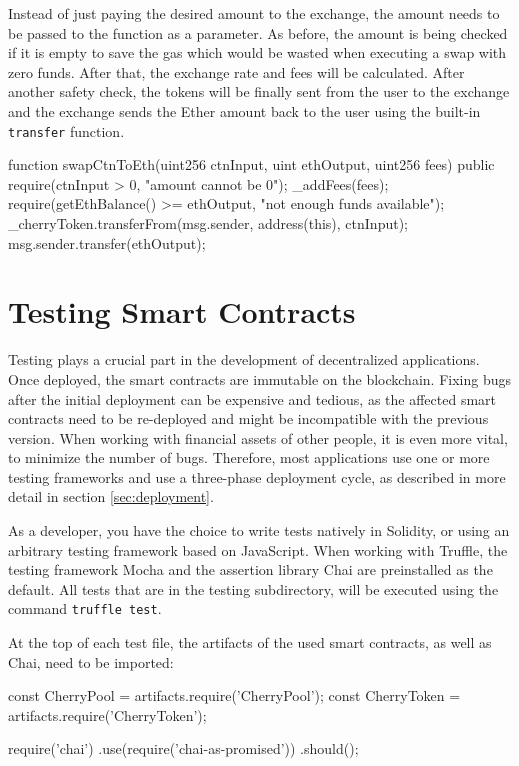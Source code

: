 Instead of just paying the desired amount to the exchange, the amount needs to be passed to the function as a parameter. As before, the amount is being checked
if it is empty to save the gas which would be wasted when executing a swap with zero funds. After that, the exchange rate and fees will be calculated. After
another safety check, the tokens will be finally sent from the user to the exchange and the exchange sends the Ether amount back to the user using the
built-in \texttt{transfer} function.

\begin{GenericCode}
  function swapCtnToEth(uint256 ctnInput, uint ethOutput, uint256 fees) public {
    require(ctnInput > 0, "amount cannot be 0");
    _addFees(fees);
    require(getEthBalance() >= ethOutput, "not enough funds available");
    _cherryToken.transferFrom(msg.sender, address(this), ctnInput);
    msg.sender.transfer(ethOutput);
  }
\end{GenericCode}

\section{Testing Smart Contracts}
Testing plays a crucial part in the development of decentralized applications. Once deployed, the smart contracts are immutable on the blockchain. Fixing bugs after the initial deployment can be expensive and tedious, as the affected smart contracts need to be re-deployed and might be incompatible with the previous version. When working with financial assets of other people, it is even more vital, to minimize the number of bugs. Therefore, most applications use one or more testing frameworks and use a three-phase deployment cycle, as described in more detail in section \ref{sec:deployment}.

As a developer, you have the choice to write tests natively in Solidity, or using an arbitrary testing framework based on JavaScript. When working with Truffle, the testing framework Mocha\cite{Mocha} and the assertion library Chai\cite{Chai} are preinstalled as the default. All tests that are in the testing subdirectory, will be executed using the command \texttt{truffle test}.

At the top of each test file, the artifacts of the used smart contracts, as well as Chai, need to be imported:
\begin{GenericCode}
const CherryPool = artifacts.require('CherryPool');
const CherryToken = artifacts.require('CherryToken');

require('chai')
  .use(require('chai-as-promised'))
  .should();	
\end{GenericCode}


